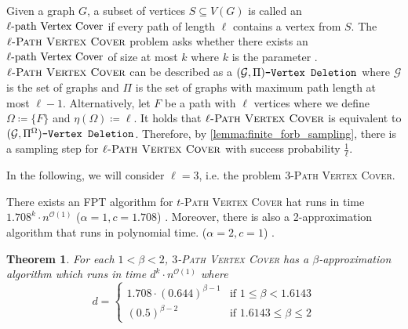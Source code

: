 \documentclass[letterpaper,11pt]{article}
\newcommand{\1}[1]{\mathds{1}\left[#1\right]}
\newcommand{\Oh}{\mathcal{O}}
\newtheorem{theorem}{Theorem}[section]
\newcommand{\gpivd}[1][\mathcal{G},\Pi]{(#1)\textnormal{\texttt{-Vertex Deletion}}}
\newcommand{\lpvc}[1][\ell]{\ensuremath{#1}\textnormal{-path Vertex Cover}}
\newcommand{\pathvc}[1]{\ensuremath{#1}\textsc{-Path Vertex Cover}\xspace}
\begin{document}
Given a graph $G$, a subset of vertices $S \subseteq V(G)$ is called an $\lpvc$
if every path of length $\ell$ contains a vertex from $S$.
The $\pathvc{\ell}$ problem asks whether there exists an $\lpvc$ of size at most $k$ where
$k$ is the parameter \cite{bresarMinimumKpathVertex2011}. $\pathvc{\ell}$ can be described
as a $\gpivd$ where $\mathcal{G}$ is the set of graphs and $\Pi$ is the set of graphs
with maximum path length at most $\ell - 1$. Alternatively, let $F$ be a path with $\ell$
vertices where we define $\Omega \coloneqq \{F\}$ and $\eta(\Omega) \coloneqq \ell$.
It holds that $\pathvc{\ell}$ is equivalent to $\gpivd[\mathcal{G}, \Pi^{\Omega}]$.
Therefore, by \cref{lemma:finite_forb_sampling}, there is
a sampling step for $\pathvc{\ell}$ with success probability $\frac{1}{\ell}$.

In the following, we will consider $\ell = 3$, i.e. the problem \pathvc{3}.

There exists an FPT algorithm for \pathvc that runs in time
$1.708^{k} \cdot n^{\Oh(1)}$ ($\alpha = 1, c = 1.708$)  \cite{cervenyGeneratingFasterAlgorithms2023}.
Moreover, there is also a 2-approximation algorithm 
that runs in polynomial time. ($\alpha = 2, c = 1$) \cite{tuFactorApproximationAlgorithm2011}.

\begin{theorem}
	For each $1 < \beta < 2$, \pathvc{3} has a $\beta$-approximation algorithm
	which runs in time $d^{k} \cdot n^{\Oh(1)}$ where
	\begin{equation}\label{eq:3pvc_runtime}
		d = \begin{cases}
			1.708 \cdot \left(0.644\right)^{\beta - 1} &\text{if } 1 \leq \beta < 1.6143\\
			\left(0.5\right)^{\beta - 2}  &\text{if } 1.6143 \leq \beta \leq 2
		\end{cases}
	\end{equation}
	
\end{theorem}
\end{document}
